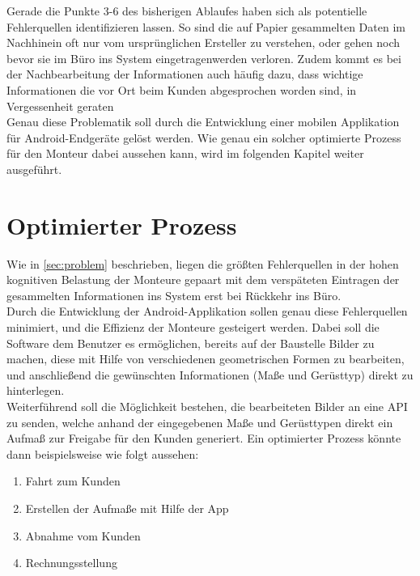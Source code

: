 Gerade die Punkte 3-6 des bisherigen Ablaufes haben sich als potentielle Fehlerquellen identifizieren lassen.
So sind die auf Papier gesammelten Daten im Nachhinein oft nur vom ursprünglichen Ersteller zu verstehen, oder gehen noch bevor sie im Büro ins System eingetragenwerden verloren.
Zudem kommt es bei der Nachbearbeitung der Informationen auch häufig dazu, dass wichtige Informationen die vor Ort beim Kunden abgesprochen worden sind, in Vergessenheit geraten  \\

Genau diese Problematik soll durch die Entwicklung einer mobilen Applikation für Android-Endgeräte gelöst werden.
Wie genau ein solcher optimierte Prozess für den Monteur dabei aussehen kann, wird im folgenden Kapitel weiter ausgeführt.

\section{Optimierter Prozess}
Wie in \autoref{sec:problem} beschrieben, liegen die größten Fehlerquellen in der hohen kognitiven Belastung der Monteure gepaart mit dem verspäteten Eintragen der gesammelten Informationen ins System erst bei Rückkehr ins Büro. \\

Durch die Entwicklung der Android-Applikation sollen genau diese Fehlerquellen minimiert, und die Effizienz der Monteure gesteigert werden.
Dabei soll die Software dem Benutzer es ermöglichen, bereits auf der Baustelle Bilder zu machen, diese mit Hilfe von verschiedenen geometrischen Formen zu bearbeiten, und anschließend die gewünschten Informationen (Maße und Gerüsttyp) direkt zu hinterlegen. \\

Weiterführend soll die Möglichkeit bestehen, die bearbeiteten Bilder an eine API  zu senden, welche anhand der eingegebenen Maße und Gerüsttypen direkt ein Aufmaß zur Freigabe für den Kunden generiert.
Ein optimierter Prozess könnte dann beispielsweise wie folgt aussehen:

\begin{enumerate}
	\item Fahrt zum Kunden
  \item Erstellen der Aufmaße mit Hilfe der App
	\item Abnahme vom Kunden
	\item Rechnungsstellung
\end{enumerate} 

